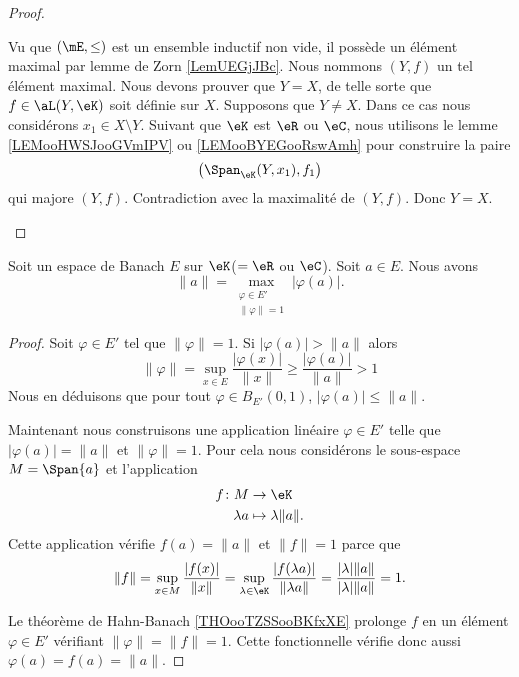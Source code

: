 \begin{proof}
\begin{subproof}
\begin{subproof}
		\end{subproof}
		Vu que \( (\mE,\leq)\) est un ensemble inductif non vide, il possède un élément maximal par lemme de Zorn \ref{LemUEGjJBc}. Nous nommons \( (Y,f)\) un tel élément maximal.
		Nous devons prouver que \( Y=X\), de telle sorte que \( f\in\aL(Y,\eK)\) soit définie sur \( X\). Supposons que \( Y\neq X\). Dans ce cas nous considérons \( x_1\in X\setminus Y\). Suivant que \( \eK\) est \( \eR\) ou \( \eC\), nous utilisons le lemme \ref{LEMooHWSJooGVmIPV} ou \ref{LEMooBYEGooRswAmh} pour construire la paire
		\begin{equation}
			\big( \Span_{\eK}(Y,x_1),f_1 \big)
		\end{equation}
		qui majore \( (Y,f)\). Contradiction avec la maximalité de \( (Y,f)\). Donc \( Y=X\).
	\end{subproof}
\end{proof}

\begin{proposition}          \label{PROPooFJPXooWrjbuH}
	Soit un espace de Banach \( E\) sur \( \eK\)(\( =\eR\) ou \( \eC\)). Soit \( a\in E\). Nous avons
	\begin{equation}
		\| a \|=\max_{\substack{\varphi\in E'\\\| \varphi \|=1}}| \varphi(a) |.
	\end{equation}
\end{proposition}

\begin{proof}
	Soit \( \varphi\in E'\) tel que \( \| \varphi \|=1\). Si \( | \varphi(a) |>\| a \|\) alors
	\begin{equation}
		\| \varphi \|=\sup_{x\in E}\frac{ | \varphi(x) | }{ \| x \| }\geq \frac{ | \varphi(a) | }{ \| a \| }>1
	\end{equation}
	Nous en déduisons que pour tout \( \varphi\in B_{E'}(0,1)\), \( | \varphi(a) |\leq \|a  \|\).

	Maintenant nous construisons une application linéaire \( \varphi\in E'\) telle que \( | \varphi(a) |=\| a \|\) et \( \| \varphi \|=1\). Pour cela nous considérons le sous-espace \( M=\Span\{ a \}\) et l'application
	\begin{equation}
		\begin{aligned}
			f\colon M & \to \eK                 \\
			\lambda a & \mapsto \lambda\| a \|.
		\end{aligned}
	\end{equation}
	Cette application vérifie \( f(a)=\| a \|\) et \( \| f\|=1\) parce que
	\begin{equation}
		\| f \|=\sup_{x\in M}\frac{ | f(x) | }{ \| x \| }=\sup_{\lambda\in\eK}\frac{ | f(\lambda a) | }{ \| \lambda a \| }=\frac{ | \lambda |\| a \| }{ | \lambda |\| a \| }=1.
	\end{equation}

	Le théorème de Hahn-Banach \ref{THOooTZSSooBKfxXE} prolonge \( f\) en un élément \( \varphi\in E'\) vérifiant \( \| \varphi \|=\| f \|=1\). Cette fonctionnelle vérifie donc aussi \( \varphi(a)=f(a)=\| a \|\).
\end{proof}

